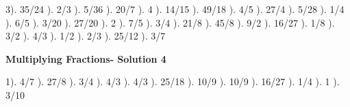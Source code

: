 \documentclass{article}%
\begin{document}
3). 35/24%
). 2/3%
). 5/36%
). 20/7%
). 4%
). 14/15%
). 49/18%
). 4/5%
). 27/4%
). 5/28%
). 1/4%
). 6/5%
). 3/20%
). 27/20%
). 2%
). 7/5%
). 3/4%
). 21/8%
). 45/8%
). 9/2%
). 16/27%
). 1/8%
). 3/2%
). 4/3%
). 1/2%
). 2/3%
). 25/12%
). 3/7%
\newline%
\newpage%
\large%
\begin{center}%
\textbf{Multiplying Fractions- Solution 4}%
\newline%
\end{center} \normalsize%
1). 4/7%
). 27/8%
). 3/4%
). 4/3%
). 4/3%
). 25/18%
). 10/9%
). 10/9%
). 16/27%
). 1/4%
). 1%
). 3/10%
\newline%
\end{document}
